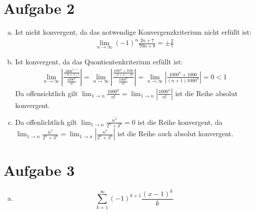 \documentclass[10pt,a4paper,parskip=half]{scrartcl}
\begin{document}
\section*{Aufgabe 2}
\begin{enumerate}[a)]
	\item 
	Ist nicht konvergent, da das notwendige Konvergenzkriterium nicht erfüllt ist:
		\begin{align*} 
			\lim_{n \to \infty} (-1)^n\frac{2n+7}{70n + 8} = \pm \frac 27 
		\end{align*}
         \item 
         Ist konvergent, da das Quontientenkriterium erfüllt ist:
            \begin{align*} 
               \lim_{n \to \infty} \left|\frac{\frac{1000^{n+1}}{(n+1)!}}{\frac{1000^n}{n!}}\right| = \lim_{n \to \infty} \left|\frac{\frac{1000^{n} + 1000}{(n+1) \cdot n!}}{\frac{1000^n}{n!}}\right| = \lim_{n \to \infty} \left|\frac{1000^{n} + 1000}{(n+1) 1000^n}\right| = 0 < 1
            \end{align*}
         Da offensichtlich gilt $\lim_{1 \to n} \frac{1000^n}{n!} = \lim_{1 \to n}  \left| \frac{1000^n}{n!} \right| $ ist die Reihe absolut konvergent.
         \item 
         Da offenlichtlich gilt $\lim_{1 \to n} \frac{n^5}{2^n+3^n} = 0$ ist die Reihe konvergent, da $\lim_{1 \to n} \frac{n^5}{2^n+3^n} = \lim_{1 \to n} \left| \frac{n^5}{2^n+3^n} \right|$ ist die Reihe auch absolut konvergent.


\end{enumerate}
\section*{Aufgabe 3}
\begin{enumerate}[a)]
	\item 
		\[ \sum_{k=1}^{\infty}(-1)^{k+1}\frac{(x-1)^k}{k} \]
\end{enumerate}
\end{document}

